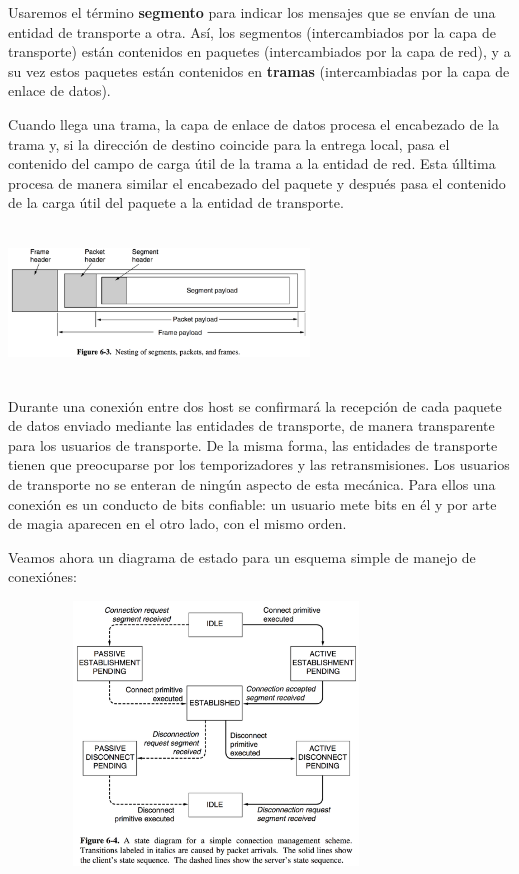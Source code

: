 \documentclass[10pt,a4paper]{report}
\begin{document}
\par Usaremos el término \textbf{segmento} para indicar los mensajes que se envían 
de una entidad de transporte a otra. Así, los segmentos (intercambiados por la capa 
de transporte) están contenidos en paquetes (intercambiados por la capa de red), y a 
su vez estos paquetes están contenidos en \textbf{tramas} (intercambiadas por la 
capa de enlace de datos).
\par Cuando llega una trama, la capa de enlace de datos procesa el encabezado de la 
trama y, si la dirección de destino coincide para la entrega local, pasa el contenido del 
campo de carga útil de la trama a la entidad de red. Esta úlltima procesa de manera 
similar el encabezado del paquete y después pasa el contenido de la carga útil del 
paquete a la entidad de transporte. 

\begin{center}
	\includegraphics[width=8cm, height=4cm]{./imagenes/segmentos.png} 
\end{center}

\par Durante una conexión entre dos host se confirmará la recepción de cada 
paquete de datos enviado mediante las entidades de transporte, de manera 
transparente para los usuarios de transporte. De la misma forma, las entidades de 
transporte tienen que preocuparse por los temporizadores y las retransmisiones. Los 
usuarios de transporte no se enteran de ningún aspecto de esta mecánica. Para ellos 
una conexión es un conducto de bits confiable: un usuario mete bits en él y por arte 
de magia aparecen en el otro lado, con el mismo orden.

\par Veamos ahora un diagrama de estado para un esquema simple de manejo de 
conexiónes:

\begin{center}
	\includegraphics[width=11cm, height=7cm]{./imagenes/diagrama.png} 
\end{center}
\end{document}

